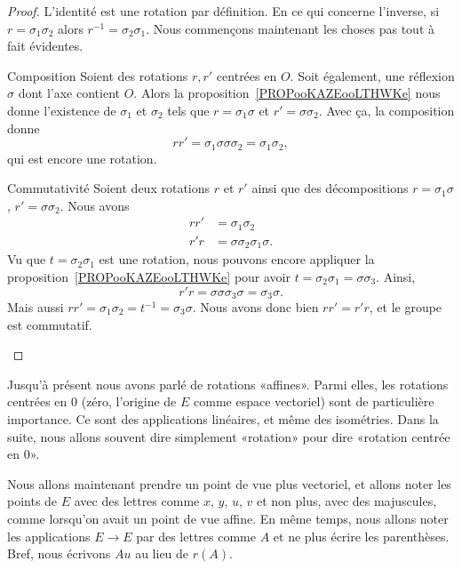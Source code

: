 \begin{proof}
	L'identité est une rotation par définition. En ce qui concerne l'inverse, si \( r=\sigma_1\sigma_2\) alors \( r^{-1}=\sigma_2\sigma_1\). Nous commençons maintenant les choses pas tout à fait évidentes.
	\begin{subproof}
		\item[Composition]
		Soient des rotations \( r,r'\) centrées en \( O\). Soit également, une réflexion \( \sigma\) dont l'axe contient \( O\). Alors la proposition~\ref{PROPooKAZEooLTHWKe} nous donne l'existence de \( \sigma_1\) et \( \sigma_2\) tels que \( r=\sigma_1\sigma\) et \( r'=\sigma\sigma_2\). Avec ça, la composition donne
		\begin{equation}
			rr'=\sigma_1\sigma\sigma\sigma_2=\sigma_1\sigma_2,
		\end{equation}
		qui est encore une rotation.
		\item[Commutativité]
		Soient deux rotations \( r\) et \( r'\) ainsi que des décompositions \( r=\sigma_1\sigma\), \( r'=\sigma\sigma_2\). Nous avons
		\begin{subequations}
			\begin{align}
				rr' & =\sigma_1\sigma_2              \\
				r'r & =\sigma\sigma_2\sigma_1\sigma.
			\end{align}
		\end{subequations}
		Vu que \( t=\sigma_2\sigma_1\) est une rotation, nous pouvons encore appliquer la proposition~\ref{PROPooKAZEooLTHWKe} pour avoir \( t=\sigma_2\sigma_1=\sigma\sigma_3\). Ainsi,
		\begin{equation}
			r'r=\sigma\sigma\sigma_3\sigma=\sigma_3\sigma.
		\end{equation}
		Mais aussi \( rr'=\sigma_1\sigma_2=t^{-1}=\sigma_3\sigma\). Nous avons donc bien \( rr'=r'r\), et le groupe est commutatif.
	\end{subproof}
\end{proof}

\begin{normaltext}      \label{NORMooOUDJooRfbDEX}
	Jusqu'à présent nous avons parlé de rotations «affines». Parmi elles, les rotations centrées en \( 0\) (zéro, l'origine de \( E\) comme espace vectoriel) sont de particulière importance. Ce sont des applications linéaires, et même des isométries. Dans la suite, nous allons souvent dire simplement «rotation» pour dire «rotation centrée en \( 0\)».

	Nous allons maintenant prendre un point de vue plus vectoriel, et allons noter les points de \( E\) avec des lettres comme \( x\), \( y\), \( u\), \( v\) et non plus, avec des majuscules, comme lorsqu'on avait un point de vue affine. En même temps, nous allons noter les applications \( E\to E \) par des lettres comme \( A\) et ne plus écrire les parenthèses. Bref, nous écrivons \( Au\) au lieu de \( r(A)\).
\end{normaltext}

